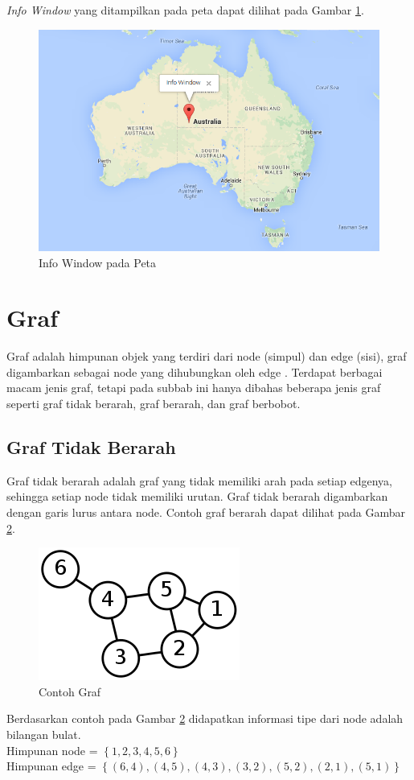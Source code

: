 \textit{Info Window} yang ditampilkan pada peta dapat dilihat pada Gambar
\ref{fig:infowindow}.
\begin{figure}[h]
\centering
\includegraphics[scale=0.62]{Gambar/infowindow}
\caption[Info Window pada Peta]{Info Window pada Peta}
\label{fig:infowindow}
\end{figure}


\section{Graf}
Graf adalah himpunan objek yang terdiri dari node (simpul) dan edge (sisi), graf 
digambarkan sebagai node yang dihubungkan oleh edge \footnotemark[2]. Terdapat
berbagai macam jenis graf, tetapi pada subbab ini hanya dibahas beberapa jenis
graf seperti graf tidak berarah, graf berarah, dan graf berbobot.

\subsection{Graf Tidak Berarah}
Graf tidak berarah adalah graf yang tidak memiliki arah pada setiap edgenya,
sehingga setiap node tidak memiliki urutan. Graf tidak berarah digambarkan dengan garis lurus
antara node. Contoh graf berarah dapat dilihat pada Gambar
\ref{fig:graph}.
\begin{figure}[h]
\centering
\includegraphics[scale=0.72]{Gambar/graph}
\caption[Contoh Graf]{Contoh Graf}
\label{fig:graph}
\end{figure}
Berdasarkan contoh pada Gambar \ref{fig:graph}  didapatkan informasi tipe dari
node adalah bilangan bulat. \\
Himpunan node = $\left\{ 1,2,3,4,5,6 \right\}$ \\
Himpunan edge = $\left\{ (6,4),(4,5),(4,3),(3,2),(5,2),(2,1),(5,1) \right\}$

